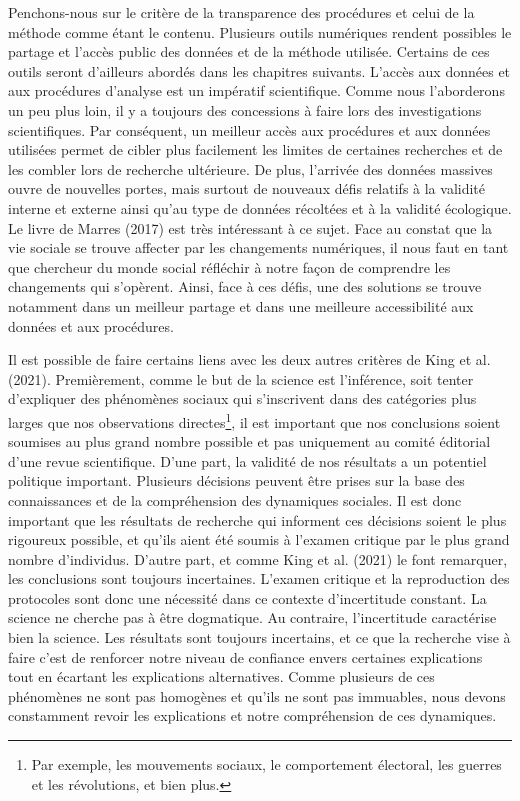 \documentclass[
  letterpaper,
  DIV=11,
  numbers=noendperiod]{scrreprt}
\begin{document}
Penchons-nous sur le critère de la transparence des procédures et celui
de la méthode comme étant le contenu. Plusieurs outils numériques
rendent possibles le partage et l'accès public des données et de la
méthode utilisée. Certains de ces outils seront d'ailleurs abordés dans
les chapitres suivants. L'accès aux données et aux procédures d'analyse
est un impératif scientifique. Comme nous l'aborderons un peu plus loin,
il y a toujours des concessions à faire lors des investigations
scientifiques. Par conséquent, un meilleur accès aux procédures et aux
données utilisées permet de cibler plus facilement les limites de
certaines recherches et de les combler lors de recherche ultérieure. De
plus, l'arrivée des données massives ouvre de nouvelles portes, mais
surtout de nouveaux défis relatifs à la validité interne et externe
ainsi qu'au type de données récoltées et à la validité écologique. Le
livre de Marres (2017) est très intéressant à ce sujet. Face au constat
que la vie sociale se trouve affecter par les changements numériques, il
nous faut en tant que chercheur du monde social réfléchir à notre façon
de comprendre les changements qui s'opèrent. Ainsi, face à ces défis,
une des solutions se trouve notamment dans un meilleur partage et dans
une meilleure accessibilité aux données et aux procédures.

Il est possible de faire certains liens avec les deux autres critères de
King et al. (2021). Premièrement, comme le but de la science est
l'inférence, soit tenter d'expliquer des phénomènes sociaux qui
s'inscrivent dans des catégories plus larges que nos observations
directes\footnote{Par exemple, les mouvements sociaux, le comportement
  électoral, les guerres et les révolutions, et bien plus.}, il est
important que nos conclusions soient soumises au plus grand nombre
possible et pas uniquement au comité éditorial d'une revue scientifique.
D'une part, la validité de nos résultats a un potentiel politique
important. Plusieurs décisions peuvent être prises sur la base des
connaissances et de la compréhension des dynamiques sociales. Il est
donc important que les résultats de recherche qui informent ces
décisions soient le plus rigoureux possible, et qu'ils aient été soumis
à l'examen critique par le plus grand nombre d'individus. D'autre part,
et comme King et al. (2021) le font remarquer, les conclusions sont
toujours incertaines. L'examen critique et la reproduction des
protocoles sont donc une nécessité dans ce contexte d'incertitude
constant. La science ne cherche pas à être dogmatique. Au contraire,
l'incertitude caractérise bien la science. Les résultats sont toujours
incertains, et ce que la recherche vise à faire c'est de renforcer notre
niveau de confiance envers certaines explications tout en écartant les
explications alternatives. Comme plusieurs de ces phénomènes ne sont pas
homogènes et qu'ils ne sont pas immuables, nous devons constamment
revoir les explications et notre compréhension de ces dynamiques.
\end{document}
